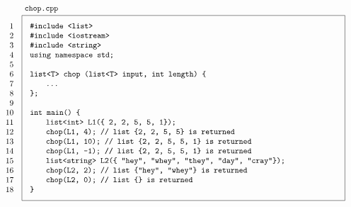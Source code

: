 \documentclass[a4paper,12pt]{article}
\newcommand\indd{${}$\hspace{20pt}}
\begin{document}
\[{\begin{tikzpicture}
\node[draw,anchor=north,inner sep=10pt] (chop) at (6.5,0) {\parbox{13.5cm}{\raggedright
\texttt{\#include <list>}\linebreak
\texttt{\#include <iostream>}\linebreak
\texttt{\#include <string>}\linebreak
\texttt{using namespace std;}\linebreak\linebreak
\texttt{list<T> chop (list<T> input, int length) \{}\linebreak
\indd\texttt{...}\linebreak
\texttt{\};}\linebreak\linebreak
\texttt{int main() \{}\linebreak
\indd\texttt{list<int> L1(\{ 2, 2, 5, 5, 1\});}\linebreak
\indd\texttt{chop(L1, 4);  // list \{2, 2, 5, 5\} is returned}\linebreak
\indd\texttt{chop(L1, 10); // list \{2, 2, 5, 5, 1\} is returned}\linebreak
\indd\texttt{chop(L1, -1); // list \{2, 2, 5, 5, 1\} is returned}\linebreak
\indd\texttt{list<string> L2(\{ "hey", "whey", "they", "day", "cray"\});}\linebreak
\indd\texttt{chop(L2, 2);  // list \{"hey", "whey"\} is returned}\linebreak
\indd\texttt{chop(L2, 0);  // list \{\} is returned}\linebreak
\texttt{\}}
}};
\node[anchor=south west] at (chop.north west) {\texttt{chop.cpp}};
\node[anchor=north,inner sep=10pt,anchor=north east] at (chop.north west) {\parbox{.7cm}{\raggedleft
1\linebreak 2\linebreak 3\linebreak 4\linebreak 5\linebreak 6\linebreak 7\linebreak 8\linebreak 9\linebreak10\linebreak11\linebreak12\linebreak13\linebreak14\linebreak15\linebreak16\linebreak17\linebreak18}};
\end{tikzpicture}
}
\]
\end{document}
